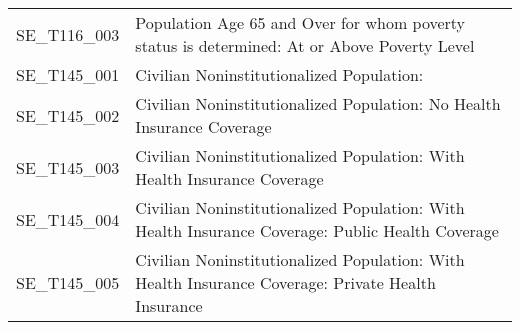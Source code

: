 \begin{longtable}{rp{5in}}
  SE\_T116\_003 & Population Age 65 and Over for whom poverty status is determined: At or Above Poverty Level \\ 
  SE\_T145\_001 & Civilian Noninstitutionalized Population: \\ 
  SE\_T145\_002 & Civilian Noninstitutionalized Population: No Health Insurance Coverage \\ 
  SE\_T145\_003 & Civilian Noninstitutionalized Population: With Health Insurance Coverage \\ 
  SE\_T145\_004 & Civilian Noninstitutionalized Population: With Health Insurance Coverage: Public Health Coverage \\ 
  SE\_T145\_005 & Civilian Noninstitutionalized Population: With Health Insurance Coverage: Private Health Insurance \\ 
   \hline
\hline
\end{longtable}
\endgroup
